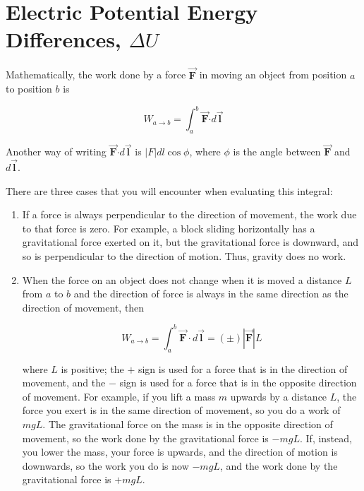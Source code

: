 \documentclass{article}
\newcommand{\bfvec}[1]{\vec{\mathbf{#1}}}
\newcommand{\bfcdot}[0]{\boldsymbol{\cdot}}
\begin{document}
\section{Electric Potential Energy Differences, $\Delta U$}


Mathematically, the work done by a force $\bfvec{F}$ in moving an object from position $a$ to position $b$ is

$$
W_{a\rightarrow b}=\int_a^b \bfvec{F}\bfcdot d\bfvec{l}
$$

Another way of writing $\bfvec{F}\bfcdot d\bfvec{l}$ is $|F|dl\cos\phi$, where $\phi$ is the angle between $\bfvec{F}$ and $d{\bfvec l}$.

There are three cases that you will encounter when evaluating this integral:

\begin{enumerate}

  \item If a force is always perpendicular to the direction of movement, the work due to that force is zero. For example, a block sliding horizontally has a gravitational force exerted on it, but the gravitational force is downward, and so is perpendicular to the direction of motion. Thus, gravity does no work.

  \item When the force on an object does not change when it is moved a distance $L$ from $a$ to $b$ and the direction of force is always in the same direction as the direction of movement, then

        $$W_{a\rightarrow b}=\int_a^b \bfvec{F}\cdot d\bfvec{l}=(\pm)|\bfvec{F}|L$$

        where $L$ is positive; the $+$ sign is used for a force that is in the direction of movement, and the $-$ sign is used for a force that is in the opposite direction of movement. For example, if you lift a mass $m$ upwards by a distance $L$, the force you exert is in the same direction of movement, so you do a work of $mgL$. The gravitational force on the mass is in the opposite direction of movement, so the work done by the gravitational force is $-mgL$. If, instead, you lower the mass, your force is upwards, and the direction of motion is downwards, so the work you do is now $-mgL$, and the work done by the gravitational force is $+mgL$.

\end{enumerate}
\end{document}
